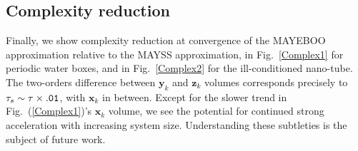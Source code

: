 \documentclass[letterpaper,twocolumn,amsmath,amsfont,amssymb,english,aps,jcp,preprintnumbers,groupaddress,nofootinbib,tightenlines,floatfix]{revtex4}
\newcommand{\mat}[1]{\boldsymbol{#1}}
\theoremstyle{plain}
\theoremstyle{remark}
\theoremstyle{plain}
\begin{document}
\subsection{Complexity reduction}
  
Finally, we show complexity reduction at convergence of the MAYEBOO approximation relative to the MAYSS approximation, 
in Fig.~\ref{Complex1} for periodic water boxes, and in Fig.~\ref{Complex2} for the ill-conditioned nano-tube. 
The two-orders difference between $\mat{y}_k$ and $\mat{z}_k$ volumes corresponds precisely to $\tau_s \sim \tau \times {\tt .01}$, 
with $\mat{x}_k$ in between. Except for the slower trend in Fig.~(\ref{Complex1})'s $\mat{x}_k$ volume, we see the 
potential for continued strong acceleration with increasing system size.  Understanding these subtleties is the subject of future work. 
\end{document}
